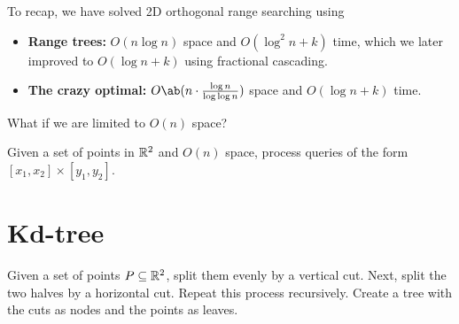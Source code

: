 
To recap, we have solved 2D orthogonal range searching using
\begin{itemize}
    \item \textbf{Range trees:} $O(n \log n)$ space and $O(\log^2 n + k)$
    time, which we later improved to $O(\log n + k)$ using fractional
    cascading.
    \item \textbf{The crazy optimal:}
    $O\ab(n \cdot \frac{\log n}{\log \log n})$
    space and $O(\log n + k)$ time.
\end{itemize}

What if we are limited to $O(n)$ space?
\begin{question*}
    Given a set of points in $\mathbb{R}^2$ and $O(n)$ space,
    process queries of the form $[x_1, x_2] \times [y_1, y_2]$.
\end{question*}
\section{Kd-tree} \label{sec:kd}
Given a set of points $P \subseteq \mathbb{R}^2$, split them evenly by a vertical
cut.
Next, split the two halves by a horizontal cut.
Repeat this process recursively.
Create a tree with the cuts as nodes and the points as leaves.

